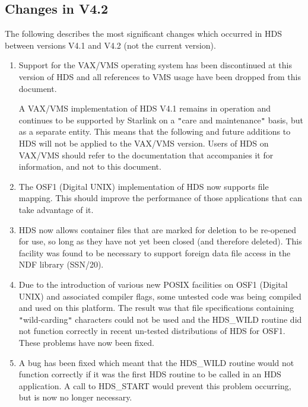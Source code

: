 \documentclass[11pt]{article}
\newcommand{\htmlref}[2]{#1}
\newcommand{\xref}[3]{#1}
\newcommand{\qt}[1]{``#1''}
\renewcommand{\qt}[1]{{\tt{"}}#1{\tt{"}}}
\begin{document}
\subsection{Changes in V4.2}

The following describes the most significant changes which occurred in HDS
between versions V4.1 and V4.2 (not the current version).

\begin{enumerate}

\item Support for the VAX/VMS operating system has been discontinued
at this version of HDS and all references to VMS usage have been
dropped from this document.

A VAX/VMS implementation of HDS V4.1 remains in operation and
continues to be supported by Starlink on a \qt{care and maintenance}
basis, but as a separate entity. This means that the following and
future additions to HDS will not be applied to the VAX/VMS
version. Users of HDS on VAX/VMS should refer to the documentation
that accompanies it for information, and not to this document.

\item The OSF1 (Digital UNIX) implementation of HDS now supports file
mapping. This should improve the performance of those applications
that can take advantage of it.

\item HDS now allows container files that are marked for deletion to
be re-opened for use, so long as they have not yet been closed (and
therefore deleted). This facility was found to be necessary to support
foreign data file access in the NDF library (\xref{SSN/20}{ssn20}{}).

\item Due to the introduction of various new POSIX facilities on OSF1
(Digital UNIX) and associated compiler flags, some untested code was
being compiled and used on this platform. The result was that file
specifications containing \qt{wild-carding} characters could not be
used and the \htmlref{HDS\_WILD}{HDS_WILD} routine did not function
correctly in recent un-tested distributions of HDS for OSF1. These
problems have now been fixed.

\item A bug has been fixed which meant that the
\htmlref{HDS\_WILD}{HDS_WILD} routine would not function correctly if
it was the first HDS routine to be called in an HDS application. A
call to \htmlref{HDS\_START}{HDS_START} would prevent this problem
occurring, but is now no longer necessary.


\end{enumerate}
\end{document}
